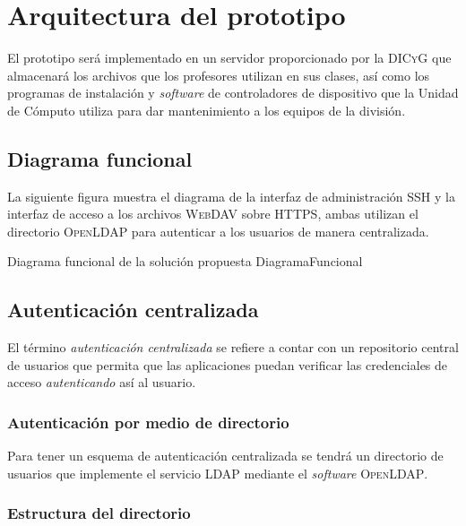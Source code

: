 \newpage
    \section {Arquitectura del prototipo}

El prototipo ser\'{a} implementado en un servidor proporcionado por la \textsc{DICyG} que almacenar\'{a} los archivos que los profesores utilizan en sus clases, as\'{i} como los programas de instalaci\'{o}n y \emph{\gls{software}} de controladores de dispositivo que la Unidad de C\'{o}mputo utiliza para dar mantenimiento a los equipos de la divisi\'{o}n.

      \subsection {Diagrama funcional}

La siguiente figura muestra el diagrama de la interfaz de administraci\'{o}n \textsc{\gls{SSH}} y la interfaz de acceso a los archivos \textsc{\gls{WebDAV}} sobre \textsc{\gls{HTTPS}}, ambas utilizan el directorio \textsc{OpenLDAP} para autenticar a los usuarios de manera centralizada.

\diagramblock
{Diagrama funcional de la soluci\'{o}n propuesta}
{DiagramaFuncional}
{
 {
  
 }
}

      \subsection {Autenticaci\'{o}n centralizada}

El t\'{e}rmino \textit{autenticaci\'{o}n centralizada} se refiere a contar con un repositorio central de usuarios que permita que las aplicaciones puedan verificar las credenciales de acceso \textit{autenticando} as\'{i} al usuario.

        \subsubsection {Autenticaci\'{o}n por medio de directorio}

Para tener un esquema de autenticaci\'{o}n centralizada se tendr\'{a} un directorio de usuarios que implemente el servicio \textsc{\gls{LDAP}} mediante el \emph{\gls{software}} \textsc{OpenLDAP}.

        \subsubsection {Estructura del directorio}


